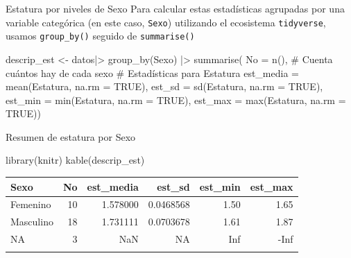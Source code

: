 \documentclass[
  ignorenonframetext,
  aspectratio=169,
  spanish,
]{beamer}
\newenvironment{Shaded}{\begin{snugshade}}{\end{snugshade}}
\newcommand{\AttributeTok}[1]{\textcolor[rgb]{0.40,0.45,0.13}{#1}}
\newcommand{\CommentTok}[1]{\textcolor[rgb]{0.37,0.37,0.37}{#1}}
\newcommand{\ConstantTok}[1]{\textcolor[rgb]{0.56,0.35,0.01}{#1}}
\newcommand{\FunctionTok}[1]{\textcolor[rgb]{0.28,0.35,0.67}{#1}}
\newcommand{\NormalTok}[1]{\textcolor[rgb]{0.00,0.23,0.31}{#1}}
\newcommand{\OtherTok}[1]{\textcolor[rgb]{0.00,0.23,0.31}{#1}}
\newcommand{\SpecialCharTok}[1]{\textcolor[rgb]{0.37,0.37,0.37}{#1}}
\begin{document}
\begin{frame}[fragile]{Estatura por niveles de Sexo}
\label{estatura-por-niveles-de-sexo}
Para calcular estas estadísticas agrupadas por una variable categórica
(en este caso, \texttt{Sexo}) utilizando el ecosistema
\texttt{tidyverse}, usamos \texttt{group\_by()} seguido de
\texttt{summarise()}

\begin{Shaded}
\begin{Highlighting}[]
\NormalTok{descrip\_est }\OtherTok{\textless{}{-}}\NormalTok{ datos}\SpecialCharTok{|\textgreater{}} 
  \FunctionTok{group\_by}\NormalTok{(Sexo) }\SpecialCharTok{|\textgreater{}} 
  \FunctionTok{summarise}\NormalTok{(}
    \AttributeTok{No =} \FunctionTok{n}\NormalTok{(), }\CommentTok{\# Cuenta cuántos hay de cada sexo}
    \CommentTok{\# Estadísticas para Estatura}
    \AttributeTok{est\_media =} \FunctionTok{mean}\NormalTok{(Estatura, }\AttributeTok{na.rm =} \ConstantTok{TRUE}\NormalTok{),}
    \AttributeTok{est\_sd =} \FunctionTok{sd}\NormalTok{(Estatura, }\AttributeTok{na.rm =} \ConstantTok{TRUE}\NormalTok{),}
    \AttributeTok{est\_min =} \FunctionTok{min}\NormalTok{(Estatura, }\AttributeTok{na.rm =} \ConstantTok{TRUE}\NormalTok{),}
    \AttributeTok{est\_max =} \FunctionTok{max}\NormalTok{(Estatura, }\AttributeTok{na.rm =} \ConstantTok{TRUE}\NormalTok{))}
\end{Highlighting}
\end{Shaded}
\end{frame}

\begin{frame}[fragile]{Resumen de estatura por Sexo}
\label{resumen-de-estatura-por-sexo}
\begin{Shaded}
\begin{Highlighting}[]
\FunctionTok{library}\NormalTok{(knitr)}
\FunctionTok{kable}\NormalTok{(descrip\_est)}
\end{Highlighting}
\end{Shaded}

\begin{longtable}[]{@{}lrrrrr@{}}
\toprule\noalign{}
Sexo & No & est\_media & est\_sd & est\_min & est\_max \\
\midrule\noalign{}
\endhead
Femenino & 10 & 1.578000 & 0.0468568 & 1.50 & 1.65 \\
Masculino & 18 & 1.731111 & 0.0703678 & 1.61 & 1.87 \\
NA & 3 & NaN & NA & Inf & -Inf \\
\bottomrule\noalign{}
\end{longtable}
\end{frame}
\end{document}
